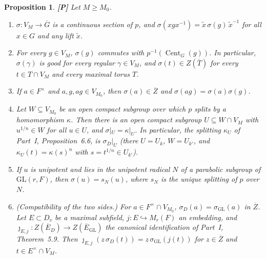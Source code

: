 \documentclass[12pt]{article}
\newcommand{\ov}[1]{\overline{#1}}
\newcommand{\Cent}{\operatorname{Cent}}
\newcommand{\GL}{\mathrm{GL}}
\newcommand{\Gb}{\ov{G}}
\newcommand{\Zb}{\ov{Z}}
\newcommand{\Eb}{\ov{E}}
\newcommand{\Tb}{\ov{T}}
\newcommand{\jj}{\jmath}
\newcommand{\sg}{\sigma}
\newcommand{\Pv}{\textbf{[P]}}
\theoremstyle{plain}
\newtheorem{proposition}[theorem]{Proposition}
\theoremstyle{definition}
\begin{document}
\begin{proposition}\label{prop:section}\Pv
Let $M\ge M_0$.
\begin{enumerate}[label=(\alph*)]
\item $\sg:V_M\to\Gb$ is a continuous section of $p$, and $\sg(xgx^{-1})=\tilde x\,\sg(g)\,\tilde x^{-1}$ for all $x\in G$ and any lift $\tilde x$.
\item For every $g\in V_M$, $\sg(g)$ commutes with $p^{-1}(\Cent_G(g))$. In particular, $\sg(\gamma)$ is good for every regular $\gamma\in V_M$, and $\sg(t)\in Z(\Tb)$ for every $t\in T\cap V_M$ and every maximal torus $T$.
\item If $a\in F^\times$ and $a,g,ag\in V_{M_0}$, then $\sg(a)\in\Zb$ and $\sg(ag)=\sg(a)\sg(g)$.
\item Let $W\subseteq V_{M_0}$ be an open compact subgroup over which $p$ splits by a homomorphism $\kappa$. Then there is an open compact subgroup $U\subseteq W\cap V_M$ with $u^{1/n}\in W$ for all $u\in U$, and $\sg|_U=\kappa|_U$. In particular, the splitting $\kappa_U$ of Part~I, Proposition~6.6, is $\sg_D|_U$ (there $U=U_k$, $W=U_{k'}$, and $\kappa_U(t)=\kappa(s)^n$ with $s=t^{1/n}\in U_{k'}$).
\item If $u$ is unipotent and lies in the unipotent radical $N$ of a parabolic subgroup of $\GL(r,F)$, then $\sg(u)=s_N(u)$, where $s_N$ is the unique splitting of $p$ over $N$.
\item \emph{(Compatibility of the two sides.)} For $a\in F^\times\cap V_{M_0}$, $\sg_D(a)=\sg_{\GL}(a)$ in $\Zb$. Let $E\subset D_v$ be a maximal subfield, $j:E\hookrightarrow M_r(F)$ an embedding, and $\jj_{E,j}:Z(\Eb_D)\to Z(\Eb_{\GL})$ the canonical identification of Part~I, Theorem~5.9. Then $\jj_{E,j}(z\,\sg_D(t))=z\,\sg_{\GL}(j(t))$ for $z\in\Zb$ and $t\in E^\times\cap V_M$.
\end{enumerate}
\end{proposition}
\end{document}
